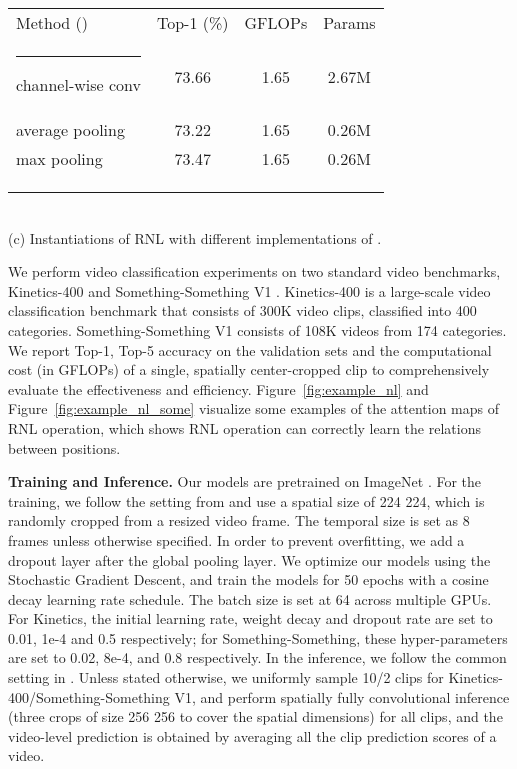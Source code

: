 \documentclass[a4paper,conference]{IEEEtran}
\makeatletter
\newcommand{\thickhline}{\noalign {\ifnum 0=`}\fi \hrule height 1pt
    \futurelet \reserved@a \@xhline
}
\makeatother
\begin{document}
\begin{table*}
    \begin{minipage}[t]{0.3\textwidth}
    \vspace{0pt}
    \setlength{\tabcolsep}{3pt}
    \begin{tabular}{lccc}
Method () & Top-1 (\%) & GFLOPs & Params \\
    \thickhline
    channel-wise conv & 73.66 & 1.65 & 2.67M\\
    average pooling & 73.22 & 1.65 & 0.26M \\
    max pooling & 73.47 & 1.65 & 0.26M \\
    \\
    \\
    \\
\end{tabular}\\
    (c) Instantiations of RNL with different implementations of . 
    \end{minipage}
    \vspace*{-0.5cm}
\end{table*}




We perform video classification experiments on two standard video benchmarks, Kinetics-400 \cite{carreira2017quo} and Something-Something V1 \cite{goyal2017something}. Kinetics-400 is a large-scale video classification benchmark that consists of 300K video clips, classified into 400 categories. Something-Something V1 consists of 108K videos from 174 categories. We report Top-1, Top-5 accuracy on the validation sets and the computational cost (in GFLOPs) of a single, spatially center-cropped clip to comprehensively evaluate the effectiveness and efficiency. Figure~\ref{fig:example_nl} and Figure~\ref{fig:example_nl_some} visualize some examples of the attention maps of RNL operation, which shows RNL operation can correctly learn the relations between positions. 

\noindent \textbf{Training and Inference.} Our models are pretrained on ImageNet \cite{imagenet_cvpr09}. For the training, we follow the setting from \cite{wang2018non} and use a spatial size of 224  224, which is randomly cropped from a resized video frame. The temporal size is set as 8 frames unless otherwise specified. In order to prevent overfitting, we add a dropout layer after the global pooling layer.
We optimize our models using the Stochastic Gradient Descent, and train the models for 50 epochs with a cosine decay learning rate schedule. The batch size is set at 64 across multiple GPUs. For Kinetics, the initial learning rate, weight decay and dropout rate are set to 0.01, 1e-4 and 0.5 respectively; for Something-Something, these hyper-parameters are set to 0.02, 8e-4, and 0.8 respectively. In the inference, we follow the common setting in \cite{wang2018non,lin2019tsm}. Unless stated otherwise, we uniformly sample 10/2 clips for Kinetics-400/Something-Something V1, and perform spatially fully convolutional inference (three crops of size 256  256 to cover the spatial dimensions) for all clips, and the video-level prediction is obtained by averaging all the clip prediction scores of a video.
\end{document}
